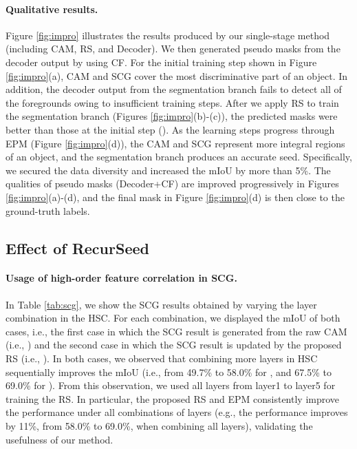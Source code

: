 \documentclass[11pt]{article}
\begin{document}
\paragraph{Qualitative results.}

Figure \ref{fig:impro} illustrates the results produced by our single-stage method (including CAM, RS, and Decoder). We then generated pseudo masks from the decoder output by using CF. For the initial training step shown in Figure \ref{fig:impro}(a), CAM and SCG cover the most discriminative part of an object. In addition, the decoder output from the segmentation branch fails to detect all of the foregrounds owing to insufficient training steps. After we apply RS to train the segmentation branch (Figures \ref{fig:impro}(b)-(c)), the predicted masks were better than those at the initial step (). As the learning steps progress through EPM (Figure \ref{fig:impro}(d)), the CAM and SCG represent more integral regions of an object, and the segmentation branch produces an accurate seed. Specifically, we secured the data diversity and increased the mIoU by more than 5\%. The qualities of pseudo masks (Decoder+CF) are improved progressively in Figures \ref{fig:impro}(a)-(d), and the final mask in Figure \ref{fig:impro}(d) is then close to the ground-truth labels.

\subsection{Effect of RecurSeed}
\label{ssec:effect_of_high_order}
\paragraph{Usage of high-order feature correlation in SCG.}
In Table \ref{tab:scg}, we show the SCG results obtained by varying the layer combination in the HSC. For each combination, we displayed the mIoU of both cases, i.e., the first case in which the SCG result is generated from the raw CAM (i.e., ) and the second case in which the SCG result is updated by the proposed RS (i.e., ). In both cases, we observed that combining more layers in HSC sequentially improves the mIoU (i.e., from 49.7\% to 58.0\% for , and 67.5\% to 69.0\% for ). From this observation, we used all layers from layer1 to layer5 for training the RS. In particular, the proposed RS and EPM consistently improve the performance under all combinations of layers (e.g., the performance improves by 11\%, from 58.0\% to 69.0\%, when combining all layers), validating the usefulness of our method.
\end{document}
